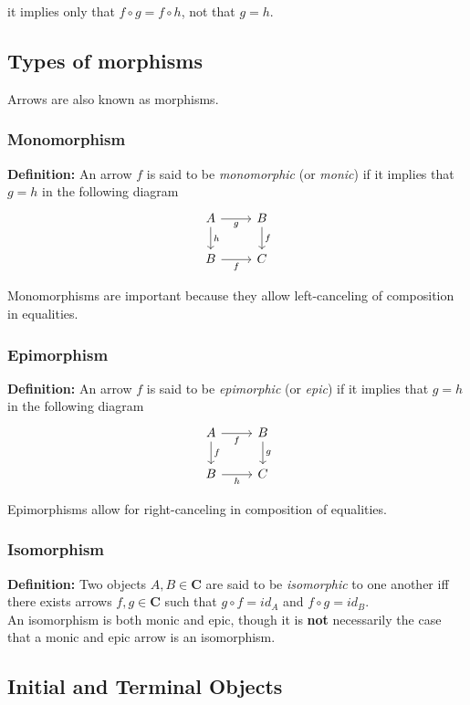 \documentclass[]{article}
\newcommand{\what}{}
\newcommand{\cat}[1]{\mathbf{#1}}
\newcommand{\defn}[2]{
\renewcommand{\what}{\textit{#1} }
\textbf{Definition:} #2\\
}
\newcommand{\cdr}[1]{\arrow[swap]{r}{#1}}
\newcommand{\cdd}[1]{\arrow{d}{#1}}
\begin{document}
it implies only that $f \circ g = f \circ h$, not that $g = h$.


\subsection{Types of morphisms}

Arrows are also known as morphisms.

\subsubsection{Monomorphism}

\defn{monomorphic}{An arrow $f$ is said to be \what (or \textit{monic}) if it implies that $g = h$ in the following diagram
}
$$\begin{tikzcd}
A \cdr{g} \cdd{h} & B \cdd{f} \\
B \cdr{f} & C
\end{tikzcd}$$

Monomorphisms are important because they allow left-canceling of composition in equalities.

\subsubsection{Epimorphism}

\defn{epimorphism}{An arrow $f$ is said to be \textit{epimorphic} (or \textit{epic}) if it implies that $g = h$ in the following diagram
}
$$\begin{tikzcd}
A \cdr{f} \cdd{f} & B \cdd{g} \\
B \cdr{h} & C
\end{tikzcd}$$

Epimorphisms allow for right-canceling in composition of equalities.

\subsubsection{Isomorphism}

\defn{isomorphism}{Two objects $A, B \in \cat{C}$ are said to be \textit{isomorphic} to one another iff there exists arrows $f, g \in \cat{C}$ such that $g\circ f = id_A$ and $f\circ g = id_B$. }

An isomorphism is both monic and epic, though it is \textbf{not} necessarily the case that a monic and epic arrow is an isomorphism.


\subsection{Initial and Terminal Objects}
\end{document}
